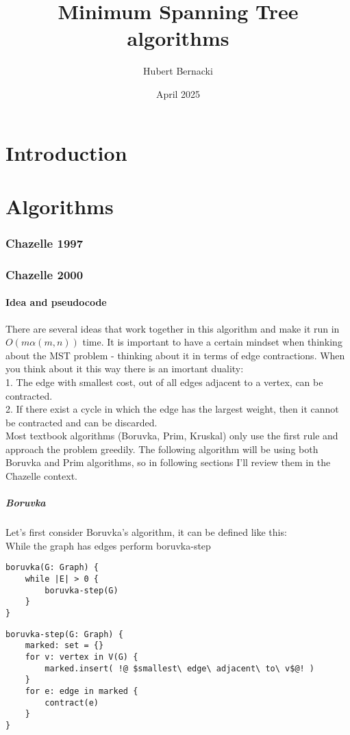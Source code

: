 \documentclass{article}
\title{Minimum Spanning Tree algorithms}
\author{Hubert Bernacki}
\date{April 2025}
\begin{document}
\maketitle

\part{Introduction}

\part{Algorithms}
\section{Chazelle 1997}
\section{Chazelle 2000}
\subsection{Idea and pseudocode}
There are several ideas that work together in this algorithm and make it run in $O(m \alpha(m, n))$ time. It is important to have a certain mindset when thinking about the MST problem - thinking about it in terms of edge contractions. When you think about it this way there is an imortant duality: \\
1. The edge with smallest cost, out of all edges adjacent to a vertex, can be contracted.\\
2. If there exist a cycle in which the edge has the largest weight, then it cannot be contracted and can be discarded. \\
Most textbook algorithms (Boruvka, Prim, Kruskal) only use the first rule and approach the problem greedily. The following algorithm will be using both Boruvka and Prim algorithms, so in following sections I'll review them in the Chazelle context.
\subsubsection{Boruvka}
Let's first consider Boruvka's algorithm, it can be defined like this: \\
While the graph has edges perform boruvka-step\\

\begin{lstlisting}
boruvka(G: Graph) {
    while |E| > 0 {
        boruvka-step(G)
    }
}
\end{lstlisting}
\begin{lstlisting}
boruvka-step(G: Graph) {
    marked: set = {}
    for v: vertex in V(G) {
        marked.insert( !@ $smallest\ edge\ adjacent\ to\ v$@! )
    }
    for e: edge in marked {
        contract(e)
    }
}
\end{lstlisting}
\end{document}

